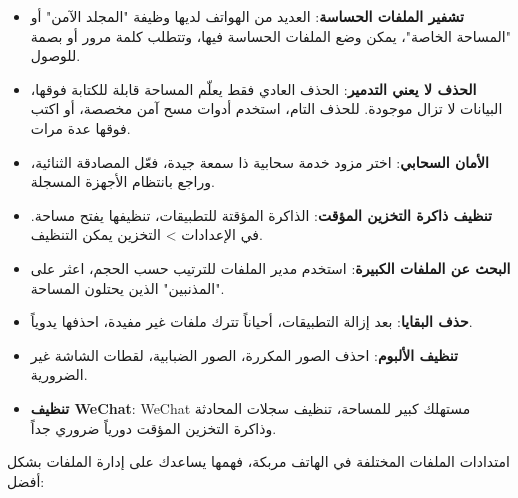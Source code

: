 
\begin{itemize}
  \item \textbf{تشفير الملفات الحساسة}: العديد من الهواتف لديها وظيفة "المجلد الآمن" أو "المساحة الخاصة"، يمكن وضع الملفات الحساسة فيها، وتتطلب كلمة مرور أو بصمة للوصول.
  \item \textbf{الحذف لا يعني التدمير}: الحذف العادي فقط يعلّم المساحة قابلة للكتابة فوقها، البيانات لا تزال موجودة. للحذف التام، استخدم أدوات مسح آمن مخصصة، أو اكتب فوقها عدة مرات.
  \item \textbf{الأمان السحابي}: اختر مزود خدمة سحابية ذا سمعة جيدة، فعّل المصادقة الثنائية، وراجع بانتظام الأجهزة المسجلة.
\end{itemize}


\begin{itemize}
  \item \textbf{تنظيف ذاكرة التخزين المؤقت}: الذاكرة المؤقتة للتطبيقات، تنظيفها يفتح مساحة. في الإعدادات > التخزين يمكن التنظيف.
  \item \textbf{البحث عن الملفات الكبيرة}: استخدم مدير الملفات للترتيب حسب الحجم، اعثر على "المذنبين" الذين يحتلون المساحة.
  \item \textbf{حذف البقايا}: بعد إزالة التطبيقات، أحياناً تترك ملفات غير مفيدة، احذفها يدوياً.
  \item \textbf{تنظيف الألبوم}: احذف الصور المكررة، الصور الضبابية، لقطات الشاشة غير الضرورية.
  \item \textbf{تنظيف WeChat}: WeChat مستهلك كبير للمساحة، تنظيف سجلات المحادثة وذاكرة التخزين المؤقت دورياً ضروري جداً.
\end{itemize}


امتدادات الملفات المختلفة في الهاتف مربكة، فهمها يساعدك على إدارة الملفات بشكل أفضل:

